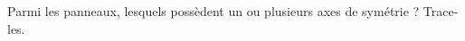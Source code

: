 \begin{pageAuto}
%
%
%
%  

 
 Parmi les panneaux, lesquels possèdent un ou plusieurs axes de symétrie ? Trace-les.
 

\end{pageAuto}
